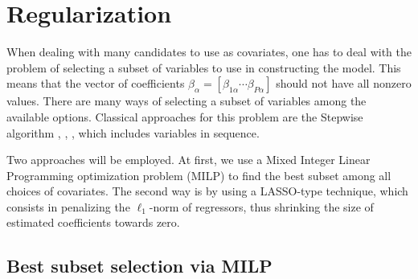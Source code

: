\section{Regularization} \label{sec:regularization}

When dealing with many candidates to use as covariates, one has to deal with the problem of selecting a subset of variables to use in constructing the model. 
This means that the vector of coefficients $\beta_\alpha = [ \beta_{1 \alpha} \cdots \beta_{P\alpha} ]$ should not have all nonzero values.
There are many ways of selecting a subset of variables among the available options.
Classical approaches for this problem are the Stepwise algorithm \cite{efroymson1960multiple}, \cite{hocking_selection_1967}, \cite{tibshirani1996regression}, which includes variables in sequence. 

Two approaches will be employed. At first, we use a Mixed Integer Linear Programming optimization problem (MILP) to find the best subset among all choices of covariates. The second way is by using a LASSO-type technique, which consists in penalizing the $\ell_1$-norm of regressors, thus shrinking the size of estimated coefficients towards zero.  

\subsection{Best subset selection via MILP}
\label{sec:best-subset-mip}

